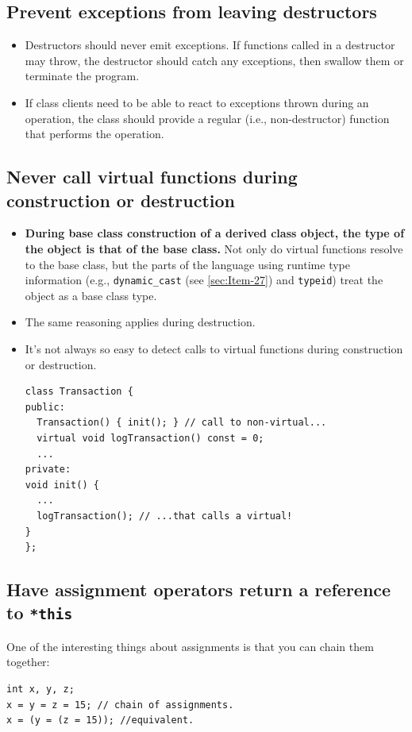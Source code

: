 \subsection{Prevent exceptions from leaving destructors}
\label{sec:Item-8}

\begin{itemize}
\item  Destructors should never emit exceptions. If functions called in a
destructor may throw, the destructor should catch any exceptions,
then swallow them or terminate the program.
\item If class clients need to be able to react to exceptions thrown during
an operation, the class should provide a regular (i.e.,
non-destructor) function that performs the operation.
\end{itemize}


\subsection{Never call virtual functions during construction or
  destruction}
\label{sec:Item-9}

\begin{itemize}
\item \textbf{During base class construction of a derived class object, the
  type of the object is that of the base class.}  Not only do virtual
functions resolve to the base class, but the
parts of the language using runtime type information (e.g.,
\texttt{dynamic\_cast} (see \ref{sec:Item-27}) and \texttt{typeid})
treat the object as a base class type.
\item The same reasoning applies during destruction.
\item It's not always so easy to detect calls to virtual functions
  during construction or destruction.
\begin{verbatim}
class Transaction {
public:
  Transaction() { init(); } // call to non-virtual...
  virtual void logTransaction() const = 0;
  ...
private:
void init() {
  ...
  logTransaction(); // ...that calls a virtual!
}
};
\end{verbatim}
\end{itemize}

\subsection{Have assignment operators return a reference to
  \texttt{*this}}
\label{sec:Item-10}

One of the interesting things about assignments is that you can chain
them together:
\begin{verbatim}
int x, y, z;
x = y = z = 15; // chain of assignments.
x = (y = (z = 15)); //equivalent.
\end{verbatim}

